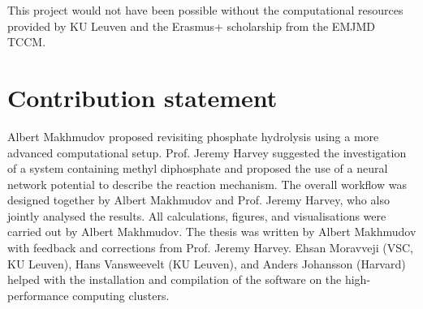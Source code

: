 \par\smallskip
This project would not have been possible without the computational resources provided by KU Leuven and the Erasmus+ scholarship from the EMJMD TCCM.


\chapter*{Contribution statement}
Albert Makhmudov proposed revisiting phosphate hydrolysis using a more advanced computational setup. Prof. Jeremy Harvey suggested the investigation of a system containing methyl diphosphate and proposed the use of a neural network potential to describe the reaction mechanism. The overall workflow was designed together by Albert Makhmudov and Prof. Jeremy Harvey, who also jointly analysed the results. All calculations, figures, and visualisations were carried out by Albert Makhmudov. The thesis was written by Albert Makhmudov with feedback and corrections from Prof. Jeremy Harvey. Ehsan Moravveji (VSC, KU Leuven), Hans Vansweevelt (KU Leuven), and Anders Johansson (Harvard) helped with the installation and compilation of the software on the high-performance computing clusters.